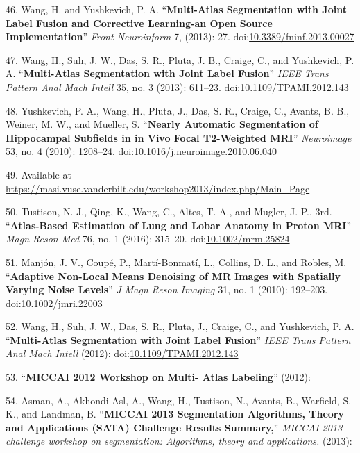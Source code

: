 \documentclass[11pt,]{article}
\begin{document}
\hypertarget{ref-Wang:2013aa}{}
46. Wang, H. and Yushkevich, P. A. ``\textbf{Multi-Atlas Segmentation
with Joint Label Fusion and Corrective Learning-an Open Source
Implementation}'' \emph{Front Neuroinform} 7, (2013): 27.
doi:\href{https://doi.org/10.3389/fninf.2013.00027}{10.3389/fninf.2013.00027}

\hypertarget{ref-Wang:2013ab}{}
47. Wang, H., Suh, J. W., Das, S. R., Pluta, J. B., Craige, C., and
Yushkevich, P. A. ``\textbf{Multi-Atlas Segmentation with Joint Label
Fusion}'' \emph{IEEE Trans Pattern Anal Mach Intell} 35, no. 3 (2013):
611--23.
doi:\href{https://doi.org/10.1109/TPAMI.2012.143}{10.1109/TPAMI.2012.143}

\hypertarget{ref-Yushkevich:2010aa}{}
48. Yushkevich, P. A., Wang, H., Pluta, J., Das, S. R., Craige, C.,
Avants, B. B., Weiner, M. W., and Mueller, S. ``\textbf{Nearly Automatic
Segmentation of Hippocampal Subfields in in Vivo Focal T2-Weighted
MRI}'' \emph{Neuroimage} 53, no. 4 (2010): 1208--24.
doi:\href{https://doi.org/10.1016/j.neuroimage.2010.06.040}{10.1016/j.neuroimage.2010.06.040}

\hypertarget{ref-MALF}{}
49. Available at
\url{https://masi.vuse.vanderbilt.edu/workshop2013/index.php/Main_Page}

\hypertarget{ref-Tustison:2016aa}{}
50. Tustison, N. J., Qing, K., Wang, C., Altes, T. A., and Mugler, J.
P., 3rd. ``\textbf{Atlas-Based Estimation of Lung and Lobar Anatomy in
Proton MRI}'' \emph{Magn Reson Med} 76, no. 1 (2016): 315--20.
doi:\href{https://doi.org/10.1002/mrm.25824}{10.1002/mrm.25824}

\hypertarget{ref-Manjon:2010aa}{}
51. Manjón, J. V., Coupé, P., Martí-Bonmatí, L., Collins, D. L., and
Robles, M. ``\textbf{Adaptive Non-Local Means Denoising of MR Images
with Spatially Varying Noise Levels}'' \emph{J Magn Reson Imaging} 31,
no. 1 (2010): 192--203.
doi:\href{https://doi.org/10.1002/jmri.22003}{10.1002/jmri.22003}

\hypertarget{ref-Wang:2012aa}{}
52. Wang, H., Suh, J. W., Das, S. R., Pluta, J., Craige, C., and
Yushkevich, P. A. ``\textbf{Multi-Atlas Segmentation with Joint Label
Fusion}'' \emph{IEEE Trans Pattern Anal Mach Intell} (2012):
doi:\href{https://doi.org/10.1109/TPAMI.2012.143}{10.1109/TPAMI.2012.143}

\hypertarget{ref-Landman2012}{}
53. ``\textbf{MICCAI 2012 Workshop on Multi- Atlas Labeling}'' (2012):

\hypertarget{ref-Asman2013}{}
54. Asman, A., Akhondi-Asl, A., Wang, H., Tustison, N., Avants, B.,
Warfield, S. K., and Landman, B. ``\textbf{MICCAI 2013 Segmentation
Algorithms, Theory and Applications (SATA) Challenge Results Summary,}''
\emph{MICCAI 2013 challenge workshop on segmentation: Algorithms, theory
and applications.} (2013):
\end{document}
